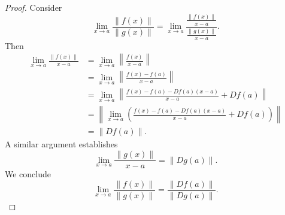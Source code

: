 \begin{Exercise}
\begin{proof}
Consider
$$
\lim_{x\to a} \frac{\| f(x) \|}{\| g(x) \|}
= \lim_{x\to a} \frac{\frac{\| f(x) \|}{x-a}}{\frac{\| g(x) \|}{x-a}}.
$$
Then
\begin{align*}
\lim_{x\to a} \frac{\| f(x) \|}{x-a}
&= \lim_{x\to a} \left\| \frac{f(x)}{x-a} \right\| \\
&= \lim_{x\to a} \left\| \frac{f(x)-f(a)}{x-a} \right\| \\
&= \lim_{x\to a} \left\| \frac{f(x)-f(a)-D f(a)(x-a)}{x-a} + D f(a) \right\| \\
&= \left\| \lim_{x\to a} \left( \frac{f(x)-f(a)-D f(a)(x-a)}{x-a} + D f(a) \right) \right\| \\
&= \| D f(a) \|.
\end{align*}
A similar argument establishes
$$
\lim_{x\to a} \frac{\| g(x) \|}{x-a} = \|D g(a) \|.
$$
We conclude
$$
\lim_{x\to a}\frac{\| f(x) \|}{\| g(x) \|}
= \frac{\| D f(a) \|}{\| D g(a) \|}.
$$
\end{proof}
\end{Exercise}